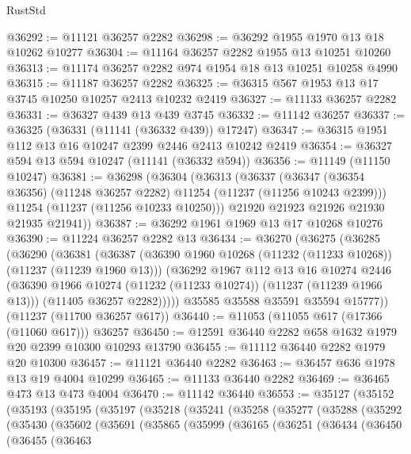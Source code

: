 \begin{lexlean}{RustStd}
\begin{coremodule}
@36292 := @11121 @36257 @2282
@36298 := @36292 @1955 @1970 @13 @18 @10262 @10277
@36304 := @11164 @36257 @2282 @1955 @13 @10251 @10260
@36313 := @11174 @36257 @2282 @974 @1954 @18 @13 @10251 @10258 @4990
@36315 := @11187 @36257 @2282
@36325 := @36315 @567 @1953 @13 @17 @3745 @10250 @10257 @2413 @10232 @2419
@36327 := @11133 @36257 @2282
@36331 := @36327 @439 @13 @439 @3745
@36332 := @11142 @36257
@36337 := @36325 (@36331 (@11141 (@36332 @439)) @17247)
@36347 := @36315 @1951 @112 @13 @16 @10247 @2399 @2446 @2413 @10242 @2419
@36354 := @36327 @594 @13 @594 @10247 (@11141 (@36332 @594))
@36356 := @11149 (@11150 @10247)
@36381 := @36298
    (@36304
      (@36313
        (@36337
          (@36347 (@36354 @36356) (@11248 @36257 @2282) @11254 (@11237 (@11256 @10243 @2399)))
          @11254
          (@11237 (@11256 @10233 @10250)))
        @21920
        @21923
        @21926
        @21930
        @21935
        @21941))
@36387 := @36292 @1961 @1969 @13 @17 @10268 @10276
@36390 := @11224 @36257 @2282 @13
@36434 := @36270
    (@36275
      (@36285
        (@36290
          (@36381
            (@36387
              (@36390 @1960 @10268 (@11232 (@11233 @10268)) (@11237 (@11239 @1960 @13)))
              (@36292
                @1967
                @112
                @13
                @16
                @10274
                @2446
                (@36390 @1966 @10274 (@11232 (@11233 @10274)) (@11237 (@11239 @1966 @13)))
                (@11405 @36257 @2282)))))
        @35585
        @35588
        @35591
        @35594
        @15777))
    (@11237 (@11700 @36257 @617))
@36440 := @11053 (@11055 @617 (@17366 (@11060 @617))) @36257
@36450 := @12591 @36440 @2282 @658 @1632 @1979 @20 @2399 @10300 @10293 @13790
@36455 := @11112 @36440 @2282 @1979 @20 @10300
@36457 := @11121 @36440 @2282
@36463 := @36457 @636 @1978 @13 @19 @4004 @10299
@36465 := @11133 @36440 @2282
@36469 := @36465 @473 @13 @473 @4004
@36470 := @11142 @36440
@36553 := @35127
    (@35152
      (@35193
        (@35195
          (@35197
            (@35218
              (@35241
                (@35258
                  (@35277
                    (@35288
                      (@35292
                        (@35430
                          (@35602
                            (@35691
                              (@35865
                                (@35999
                                  (@36165
                                    (@36251
                                      (@36434
                                        (@36450
                                          (@36455
                                            (@36463

\end{coremodule}
\end{lexlean}
